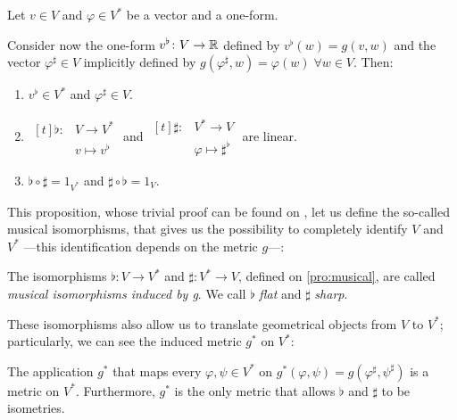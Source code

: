 \begin{proposition}
	\label{pro:musical}
	Let $v \in V$ and $\varphi \in V^*$ be a vector and a one-form.
	
	Consider now the one-form $v^\flat \colon V \to \mathbb{R}$ defined by $v^\flat(w) = g(v, w)$ and the vector $\varphi^\sharp \in V$ implicitly defined by $g(\varphi^\sharp, w) = \varphi(w) \;\forall w \in V$. Then:
	\begin{enumerate}
		\item $v^\flat \in V^*$ and $\varphi^\sharp \in V$.
		\item $\begin{aligned}[t]
			\flat \colon &V \to V^* \\
			&v \mapsto v^\flat
		\end{aligned}$ and $\begin{aligned}[t]
			\sharp \colon &V^* \to V \\
			&\varphi \mapsto \sharp^\flat
		\end{aligned}$ are linear.
		\item $\flat \circ \sharp = 1_{V^*}$ and $\sharp \circ \flat = 1_V$.
	\end{enumerate}	
\end{proposition}

This proposition, whose trivial proof can be found on \cite[Proposition 9.30]{romero86}, let us define the so-called musical isomorphisms, that gives us the possibility to completely identify $V$ and $V^*$ ---this identification depends on the metric $g$---:

\begin{definition}
	The isomorphisms $\flat \colon V \to V^*$ and $\sharp \colon V^* \to V$, defined on \autoref{pro:musical}, are called \emph{musical isomorphisms induced by g}. We call $\flat$ \emph{flat} and $\sharp$ \emph{sharp}.
\end{definition}

These isomorphisms also allow us to translate geometrical objects from $V$ to $V^*$; particularly, we can see the induced metric $g^*$ on $V^*$:

\begin{proposition}
	The application $g^*$ that maps every $\varphi, \psi \in V^*$ on $g^*(\varphi,\psi) = g(\varphi^\sharp, \psi^\sharp)$ is a metric on $V^*$. Furthermore, $g^*$ is the only metric that allows $\flat$ and $\sharp$ to be isometries.
\end{proposition}


